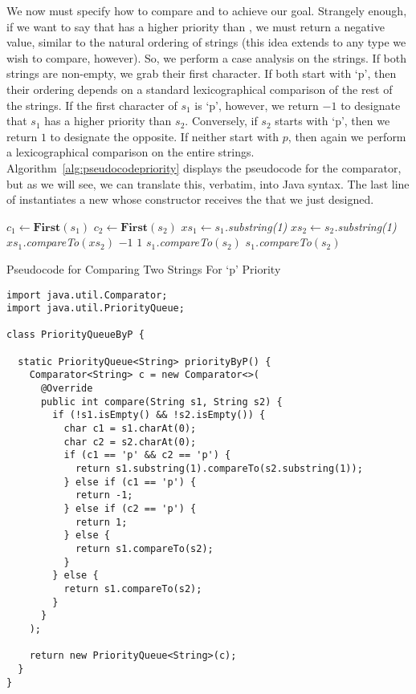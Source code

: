 We now must specify how to compare  and  to achieve our goal. Strangely enough, if we want to say that  has a higher priority than , we must return a negative value, similar to the natural ordering of strings (this idea extends to any type we wish to compare, however). So, we perform a case analysis on the strings. If both strings are non-empty, we grab their first character. If both start with `p', then their ordering depends on a standard lexicographical comparison of the rest of the strings. If the first character of $s_1$ is `p', however, we return $-1$ to designate that $s_1$ has a higher priority than $s_2$. Conversely, if $s_2$ starts with `p', then we return $1$ to designate the opposite. If neither start with $p$, then again we perform a lexicographical comparison on the entire strings. Algorithm~\ref{alg:pseudocodepriority} displays the pseudocode for the comparator, but as we will see, we can translate this, verbatim, into Java syntax. The last line of  instantiates a new  whose constructor receives the  that we just designed. 
\begin{algorithm}[H]
\begin{algorithmic}
        \State $c_1 \gets \textbf{First}(s_1)$
        \State $c_2 \gets \textbf{First}(s_2)$
            \State $xs_1 \gets s_1$\textit{.substring(1)}
            \State $xs_2 \gets s_2$\textit{.substring(1)}
            \State \Return $xs_1$\textit{.compareTo}$(xs_2)$
            \State \Return $-1$
            \State \Return $1$
        \Else
            \State \Return $s_1$\textit{.compareTo}$(s_2)$
        \EndIf
    \Else
        \State \Return $s_1$\textit{.compareTo}$(s_2)$
    \EndIf
\EndProcedure
\end{algorithmic}
\caption{Pseudocode for Comparing Two Strings For `p' Priority}
\label{alg:pseudocodeinsertion}
\end{algorithm}

\begin{cl}[]{}
\begin{lstlisting}[language=MyJava]
import java.util.Comparator;
import java.util.PriorityQueue;

class PriorityQueueByP {

  static PriorityQueue<String> priorityByP() {
    Comparator<String> c = new Comparator<>(
      @Override
      public int compare(String s1, String s2) {
        if (!s1.isEmpty() && !s2.isEmpty()) {
          char c1 = s1.charAt(0);
          char c2 = s2.charAt(0);
          if (c1 == 'p' && c2 == 'p') {
            return s1.substring(1).compareTo(s2.substring(1));
          } else if (c1 == 'p') {
            return -1;
          } else if (c2 == 'p') {
            return 1;
          } else {
            return s1.compareTo(s2);
          }
        } else {
          return s1.compareTo(s2);
        }
      }
    );

    return new PriorityQueue<String>(c);
  }
}
\end{lstlisting}
\end{cl}

